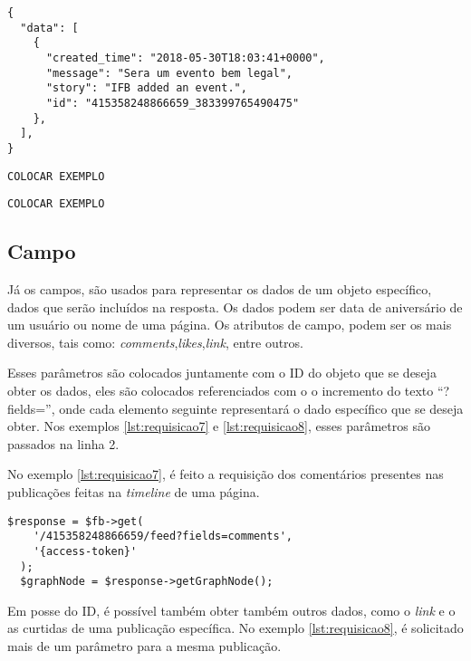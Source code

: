 \begin{lstlisting}[caption={Resposta da requisição \ref{lst:eventosPagina} (Eventos)},label={lst:respostaEventos}]
{
  "data": [
    {
      "created_time": "2018-05-30T18:03:41+0000",
      "message": "Sera um evento bem legal",
      "story": "IFB added an event.",
      "id": "415358248866659_383399765490475"
    },
  ],
}
\end{lstlisting} 

\begin{lstlisting}[caption={Resposta da requisição \ref{lst:comentariosPostagem} (Comentários)},label={lst:respostaComentarios}]
COLOCAR EXEMPLO
\end{lstlisting} 

\begin{lstlisting}[caption={Resposta da requisição \ref{lst:curtidasComentario} (Likes)},label={lst:respostaCurtidas}]
COLOCAR EXEMPLO
\end{lstlisting} 

\subsection{Campo}
Já os campos, são usados para representar os dados de um objeto específico, dados que serão incluídos na resposta. Os dados podem ser data de aniversário de um usuário ou nome de uma página. Os atributos de campo, podem ser os mais diversos, tais como: \textit{comments},\textit{likes},\textit{link}, entre outros. 

Esses parâmetros são colocados juntamente com o ID do objeto que se deseja obter os dados, eles são colocados referenciados com o o incremento do texto ``?fields='', onde cada elemento seguinte representará o dado específico que se deseja obter. Nos exemplos \ref{lst:requisicao7} e \ref{lst:requisicao8}, esses parâmetros são passados na linha 2.

No exemplo \ref{lst:requisicao7}, é feito a requisição dos comentários presentes nas publicações feitas na \textit{timeline} de uma página.

\begin{lstlisting}[caption={Requisitar os comentários de todas as publicações da página},label={lst:requisicao7}]
  $response = $fb->get(
    '/415358248866659/feed?fields=comments',
    '{access-token}' 
  );
  $graphNode = $response->getGraphNode(); 
\end{lstlisting}

Em posse do ID, é possível também obter também outros dados, como o \textit{link} e o as curtidas de uma publicação específica. No exemplo \ref{lst:requisicao8}, é solicitado mais de um parâmetro para a mesma publicação.

